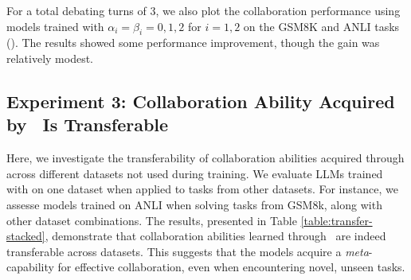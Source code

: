 {For a total debating turns of 3, we also plot the collaboration performance  using models trained with \(\alpha_i = \beta_i = 0, 1, 2\) for \(i = 1, 2\) on the GSM8K and ANLI tasks (). The results showed some performance improvement, though the gain was relatively modest.}

\safevspace{-2mm}





\subsection{Experiment 3: Collaboration Ability Acquired by \ours~Is Transferable}
Here, we investigate the transferability of collaboration abilities acquired through \oursspace across different datasets not used during training. We evaluate LLMs trained with \oursspace on one dataset when applied to tasks from other datasets. For instance, we assesse models trained on ANLI when solving tasks from GSM8k, along with other dataset combinations.
The results, presented in Table \ref{table:transfer-stacked}, demonstrate that collaboration abilities learned through \ours~are indeed transferable across datasets. This suggests that the models acquire a \textit{meta}-capability for effective collaboration, even when encountering novel, unseen tasks.
\vspace{-3mm}


\begin{table}[!ht]
  \centering
  \caption{Performance comparison (Accuracy) of 3-agent collaboration using 
           \textit{off-the-shelf} vs.\ \textit{trained} LLMs. 
           For each dataset pair (rows in bold), the first row shows 
           the off-the-shelf performance and the second row shows the 
           trained model performance, across Turns 1--3.}
  \label{table:transfer-stacked}
\end{table}




